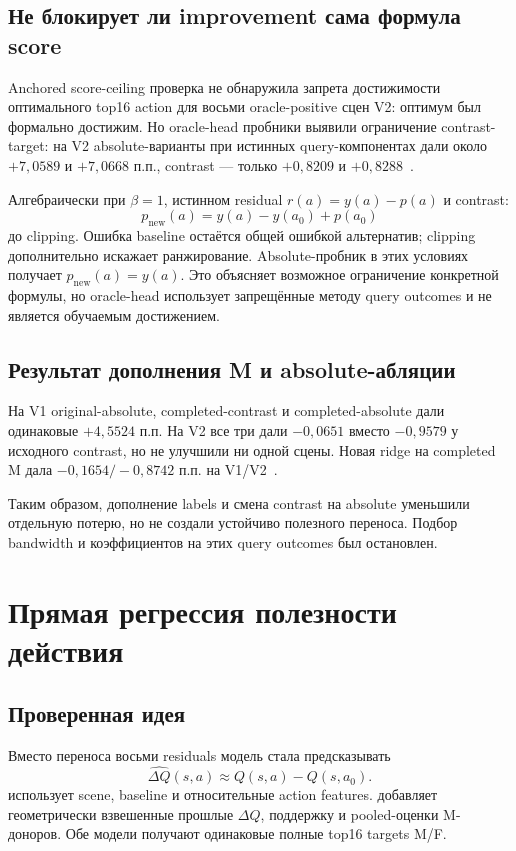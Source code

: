 \documentclass[11pt,a4paper]{article}
\newcommand{\code}[1]{\texttt{\detokenize{#1}}}
\begin{document}
\subsection{Не блокирует ли improvement сама формула score}
Anchored score-ceiling проверка не обнаружила запрета достижимости оптимального top16 action для восьми oracle-positive сцен V2: оптимум был формально достижим. Но oracle-head пробники выявили ограничение contrast-target: на V2 absolute-варианты при истинных query-компонентах дали около $+7{,}0589$ и $+7{,}0668$ п.п., contrast --- только $+0{,}8209$ и $+0{,}8288$~\cite{ceiling}.

Алгебраически при $\beta=1$, истинном residual $r(a)=y(a)-p(a)$ и contrast:
\begin{equation}
 p_{\mathrm{new}}(a)=y(a)-y(a_0)+p(a_0)
\end{equation}
до clipping. Ошибка baseline остаётся общей ошибкой альтернатив; clipping дополнительно искажает ранжирование. Absolute-пробник в этих условиях получает $p_{\mathrm{new}}(a)=y(a)$. Это объясняет возможное ограничение конкретной формулы, но oracle-head использует запрещённые методу query outcomes и не является обучаемым достижением.

\subsection{Результат дополнения M и absolute-абляции}
На V1 original-absolute, completed-contrast и completed-absolute дали одинаковые $+4{,}5524$ п.п. На V2 все три дали $-0{,}0651$ вместо $-0{,}9579$ у исходного contrast, но не улучшили ни одной сцены. Новая ridge на completed M дала $-0{,}1654/-0{,}8742$ п.п. на V1/V2~\cite{completion}.

Таким образом, дополнение labels и смена contrast на absolute уменьшили отдельную потерю, но не создали устойчиво полезного переноса. Подбор bandwidth и коэффициентов на этих query outcomes был остановлен.

\section{Прямая регрессия полезности действия}
\subsection{Проверенная идея}
Вместо переноса восьми residuals модель стала предсказывать
\begin{equation}
 \widehat{\Delta Q}(s,a)\approx Q(s,a)-Q(s,a_0).
\end{equation}
\code{direct_no_memory} использует scene, baseline и относительные action features. \code{direct_memory} добавляет геометрически взвешенные прошлые $\Delta Q$, поддержку и pooled-оценки M-доноров. Обе модели получают одинаковые полные top16 targets M/F.
\end{document}
